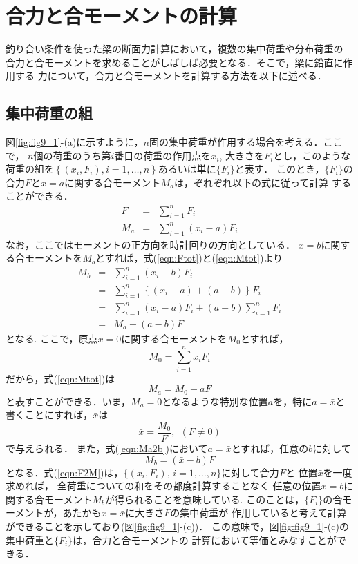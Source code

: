 \documentclass[10pt,a4j]{jarticle}
\begin{document}
\section{合力と合モーメントの計算}
釣り合い条件を使った梁の断面力計算において，複数の集中荷重や分布荷重の
合力と合モーメントを求めることがしばしば必要となる．そこで，梁に鉛直に作用する
力について，合力と合モーメントを計算する方法を以下に述べる．
\subsection{集中荷重の組}
図\ref{fig:fig9_1}-(a)に示すように，$n$固の集中荷重が作用する場合を考える．ここで，
$n$個の荷重のうち第$i$番目の荷重の作用点を$x_i$, 大きさを$F_i$とし，このような
荷重の組を$\left\{ \left(x_i, F_i\right), i=1,\dots ,n\right\}$あるいは単に$\{F_i\}$と表す．
このとき，$\{F_i\}$の合力$F$と$x=a$に関する合モーメント$M_a$は，ぞれぞれ以下の式に従って計算
することができる．
\begin{eqnarray}
	F &=& \sum_{i=1}^n F_i 
	\label{eqn:Ftot}
	\\
	M_a &=& \sum_{i=1}^n (x_i-a)F_i 
	\label{eqn:Mtot}
\end{eqnarray}
なお，ここではモーメントの正方向を時計回りの方向としている．
$x=b$に関する合モーメントを$M_b$とすれば，式(\ref{eqn:Ftot})と(\ref{eqn:Mtot})より
\begin{eqnarray}
	M_b &=& \sum_{i=1}^n (x_i-b)F_i  \nonumber \\
	    &=& \sum_{i=1}^n \left\{ (x_i-a)+(a-b)\right\}F_i  \nonumber \\
	    &=& \sum_{i=1}^n (x_i-a)F_i +(a-b)\sum_{i=1}^n F_i  \nonumber \\
	    &=& M_a +(a-b)F 
	\label{eqn:Ma2b}
\end{eqnarray}
となる. ここで，原点$x=0$に関する合モーメントを$M_0$とすれば，
\begin{equation}
	M_0= \sum_{i=1}^n x_i F_i 
	\label{eqn:M0}
\end{equation}
だから，式(\ref{eqn:Mtot})は
\begin{equation}
	M_a = M_0 -aF 
	\label{eqn:}
\end{equation}
と表すことができる．いま，$M_a=0$となるような特別な位置$a$を，特に$a=\bar x$と
書くことにすれば，$\bar x$は
\begin{equation}
	\bar{x} = \frac{M_0}{F}, \ \ (F\neq 0)
	\label{eqn:xbar}
\end{equation}
で与えられる． また，式(\ref{eqn:Ma2b})において$a=\bar x$とすれば，任意の$b$に対して
\begin{equation}
	M_b= \left( \bar x - b\right) F
	\label{eqn:F2M}
\end{equation}
となる．式(\ref{eqn:F2M})は，$\{ (x_i, F_i),\, i=1,\dots ,n\}$に対して合力$F$と
位置$\bar x$を一度求めれば， 全荷重についての和をその都度計算することなく
任意の位置$x=b$に関する合モーメント$M_b$が得られることを意味している.
このことは，$\{F_i\}$の合モーメントが，あたかも$x=\bar x$に大きさ$F$の集中荷重が
作用していると考えて計算ができることを示しており(図\ref{fig:fig9_1}-(c))．
この意味で，図\ref{fig:fig9_1}-(c)の集中荷重と$\{ F_i\}$は，合力と合モーメントの
計算において等価とみなすことができる．
\end{document}
